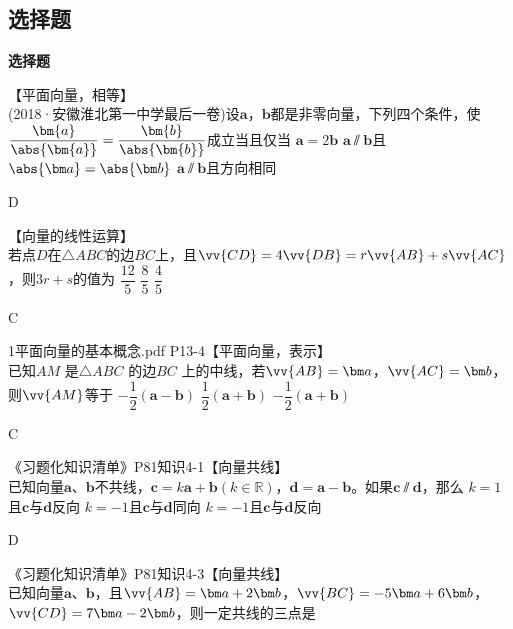   \subsection{选择题}
  \begin{exercise}{\bf 选择题}
    \item 【平面向量，相等】\\
      (2018·安徽淮北第一中学最后一卷)设$\bm{a}$，$\bm{b}$都是非零向量，下列四个条件，使$\dfrac{\bm{a}}{\abs{\bm{a}}}=\dfrac{\bm{b}}{\abs{\bm{b}}}$成立当且仅当\xz
      {$\bm a=2\bm b$}
      {$\bm a\varparallel\bm b$且$\abs{\bm a}=\abs{\bm b}$}
      {$\bm a\varparallel\bm b$且方向相同}
      \begin{answer}
        D
      \end{answer}
    \item 【向量的线性运算】\\
      若点$D$在$\triangle{ABC}$的边$BC$上，且$\vv{CD}=4\vv{DB}=r\vv{AB}+s\vv{AC}$，则$3r+s$的值为\xz
       {$\dfrac{12}5$}
       {$\dfrac{8}5$}
       {$\dfrac{4}5$}
      \begin{answer}
        C
      \end{answer}
    \item 1平面向量的基本概念.pdf P13-4【平面向量，表示】\\
      已知$AM$ 是$\triangle ABC$ 的边$BC$ 上的中线，若$\vv{AB}=\bm a$，$\vv{AC}=\bm b$，则$\vv{AM}$等于\xz
        {$-\dfrac12(\bm a-\bm b)$}
        {$\dfrac12(\bm a+\bm b)$}
        {$-\dfrac12(\bm a+\bm b)$}
      \begin{answer}
        C
      \end{answer}
    \item 《习题化知识清单》P81知识4-1【向量共线】\\
      已知向量$\bm a$、$\bm b$不共线，$\bm c=k\bm a+\bm b({k\in\mathbb{R}})$，$\bm d=\bm a-\bm b$。如果$\bm c\varparallel \bm d$，那么\xz
        {$k=1$且$\bm c$与$\bm d$反向}
        {$k=-1$且$\bm c$与$\bm d$同向}
        {$k=-1$且$\bm c$与$\bm d$反向}
      \begin{answer}
        D
      \end{answer}
    \item 《习题化知识清单》P81知识4-3【向量共线】\\
      已知向量$\bm a$、$\bm b$，且$\vv{AB}=\bm a+2\bm b$，$\vv{BC}=-5\bm a+6\bm b$，$\vv{CD}=7\bm a-2\bm b$，则一定共线的三点是\xz

\end{exercise}
